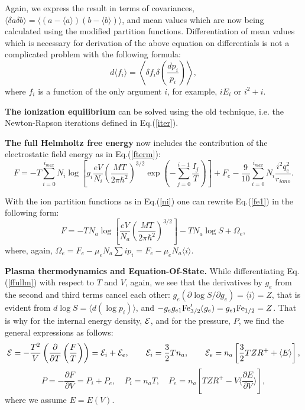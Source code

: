 Again, we express the result in terms of covariances,
$\langle \delta a \delta b \rangle = \langle (a - \langle a \rangle) (b - \langle b \rangle) \rangle$,
and mean values which are now being calculated
using the modified partition functions.
Differentiation of mean values which is necessary for derivation of the above equation on
differentials is not a complicated problem with the following formula:
\begin{equation}
d \langle f_i \rangle = \left\langle \delta f_i \delta\left( \frac{dp_i}{p_i} \right) \right\rangle,
\end{equation}
where $f_i$ is a function of the only argument $i$, for example, $iE_i$ or $i^2+i$.

{\bf The ionization equilibrium} can be solved using the old technique, i.e. the Newton-Rapson
iterations defined in Eq.(\ref{iter}).

{\bf The full Helmholtz free energy} now includes the contribution of the electrostatic field energy as in Eq.(\ref{fterm}):
\begin{equation}\label{fe1}
F=-T
\sum_{i=0}^{i_{max}}{
N_i\log\left[g_i
  \frac{eV}{N_i}\left(\frac{MT}{2\pi \hbar^2}\right)^{3/2}\exp \left(-\sum_{j=0}^{i-1}\frac{I_j}T \right)\right]}+F_e
  -\frac{9}{10} \sum_{i=0}^{i_{max}} N_i \frac{i^2 q_e^2}{r_{iono}}.
\end{equation}  

With the ion partition functions as in Eq.(\ref{ni}) one can rewrite Eq.(\ref{fe1}) in the following form:
\begin{equation}\label{ffullm}
F = -TN_a\log\left[\frac{eV}{N_a}\left(\frac{MT}{2\pi \hbar^2}\right)^{3/2}\right]-TN_a\log S + \Omega_e, 
\end{equation}
where, again, $\Omega_e = F_e - \mu_e N_a \sum i p_i = F_e - \mu_e N_a \langle i \rangle $.

{\bf Plasma thermodynamics and Equation-Of-State.} 
While differentiating Eq.(\ref{ffullm}) with respect to $T$ and $V$, again, we see that the derivatives
by $g_e$ from the second and third terms cancel 
each other: $g_e(\partial \log S/\partial g_e)=\langle i\rangle=Z$,
that is evident from $d \log S = \langle d (\log p_i) \rangle$,
and $-g_eg_{e1}{\rm Fe}^\prime_{3/2}(g_e)=g_{e1}{\rm Fe}_{1/2}=Z$.
That is why for the internal energy density,
${\cal E}$, and for the pressure, $P$, we find the general expressions
as follows:
\begin{equation}\label{generalE}
{\cal E} = -\frac{T^2}V\left(\frac{\partial}{\partial T}\left(\frac F T\right)\right)=
{\cal E}_i+{\cal E}_e,\qquad{\cal E}_i=\frac32Tn_a,\qquad
{\cal E}_e = n_a\left[ \frac32 T Z R^+ + \langle E \rangle \right],
\end{equation}
\begin{equation}\label{generalP}
P = -\frac{\partial F}{\partial V}=P_i+P_e,\quad
P_i = n_aT,\quad
P_e = n_a \left[ T ZR^+ - V \langle \frac{\partial E}{\partial V} \rangle \right],
\end{equation}
where we assume $E=E(V)$.

